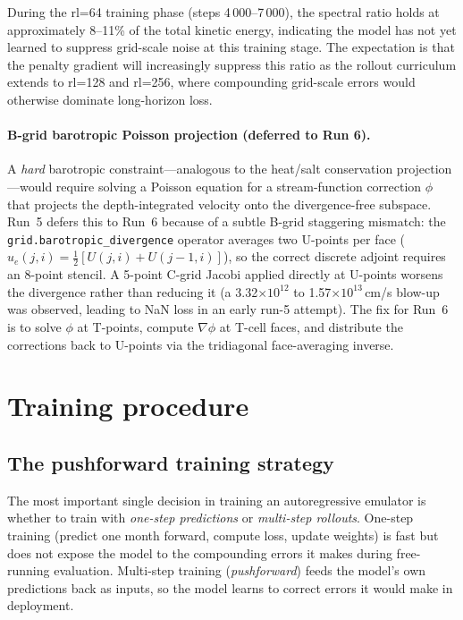 \documentclass[11pt]{article}
\begin{document}
During the rl=64 training phase (steps 4\,000--7\,000), the spectral ratio
holds at approximately 8--11\% of the total kinetic energy, indicating the
model has not yet learned to suppress grid-scale noise at this training stage.
The expectation is that the penalty gradient will increasingly suppress this
ratio as the rollout curriculum extends to rl=128 and rl=256, where compounding
grid-scale errors would otherwise dominate long-horizon loss.

\paragraph{B-grid barotropic Poisson projection (deferred to Run 6).}
A \emph{hard} barotropic constraint---analogous to the heat/salt conservation
projection---would require solving a Poisson equation for a stream-function
correction $\phi$ that projects the depth-integrated velocity onto the
divergence-free subspace. Run~5 defers this to Run~6 because of a subtle
B-grid staggering mismatch: the \texttt{grid.barotropic\_divergence} operator
averages two U-points per face ($u_e(j,i) = \tfrac{1}{2}[U(j,i)+U(j-1,i)]$),
so the correct discrete adjoint requires an 8-point stencil. A 5-point
C-grid Jacobi applied directly at U-points worsens the divergence rather
than reducing it (a 3.32$\times10^{12}$ to 1.57$\times10^{13}$\,cm/s blow-up
was observed, leading to NaN loss in an early run-5 attempt). The fix for
Run~6 is to solve $\phi$ at T-points, compute $\nabla\phi$ at T-cell faces,
and distribute the corrections back to U-points via the tridiagonal
face-averaging inverse.

\section{Training procedure}
\label{sec:training}

\subsection{The pushforward training strategy}
\label{sec:pushforward}
The most important single decision in training an autoregressive emulator is
whether to train with \emph{one-step predictions} or \emph{multi-step
rollouts}. One-step training (predict one month forward, compute loss, update
weights) is fast but does not expose the model to the compounding errors it
makes during free-running evaluation. Multi-step training
(\emph{pushforward}) feeds the model's own predictions back as inputs, so the
model learns to correct errors it would make in deployment.
\end{document}
